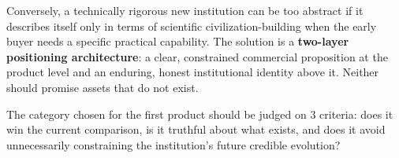 Conversely, a technically rigorous new institution can be too abstract if it describes itself only in terms of scientific civilization-building when the early buyer needs a specific practical capability. The solution is a \textbf{two-layer positioning architecture}: a clear, constrained commercial proposition at the product level and an enduring, honest institutional identity above it. Neither should promise assets that do not exist.

The category chosen for the first product should be judged on 3 criteria: does it win the current comparison, is it truthful about what exists, and does it avoid unnecessarily constraining the institution's future credible evolution?
